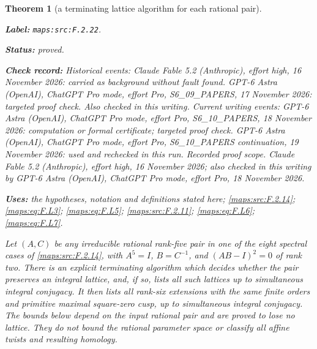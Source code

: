 \documentclass[11pt,a4paper]{article}
\newtheorem{theorem}{Theorem}[section]
\theoremstyle{definition}
\newcommand{\StatementRecord}[4]{\par\smallskip\begingroup\upshape\raggedright\noindent\textbf{Label:} \nolinkurl{#1}.\par\noindent\textbf{Status:} #2.\par\noindent\textbf{Check record:} #3.\par\noindent\textbf{Uses:} #4.\par\endgroup\smallskip}
\begin{document}
\begin{theorem}[a terminating lattice algorithm for each rational pair]\label{maps:src:F.2.22}
\StatementRecord{maps:src:F.2.22}{proved}{Historical events: Claude Fable 5.2 (Anthropic), effort high, 16 November 2026: carried as background without fault found. GPT-6 Astra (OpenAI), ChatGPT Pro mode, effort Pro, S6\_09\_PAPERS, 17 November 2026: targeted proof check. Also checked in this writing. Current writing events: GPT-6 Astra (OpenAI), ChatGPT Pro mode, effort Pro, S6\_10\_PAPERS, 18 November 2026: computation or formal certificate; targeted proof check. GPT-6 Astra (OpenAI), ChatGPT Pro mode, effort Pro, S6\_10\_PAPERS continuation, 19 November 2026: used and rechecked in this run. \emph{Recorded proof scope.} Claude Fable 5.2 (Anthropic), effort high, 16 November 2026; also checked in this writing by GPT-6 Astra (OpenAI), ChatGPT Pro mode, effort Pro, 18 November 2026}{the hypotheses, notation and definitions stated here; \cref{maps:src:F.2.14}; \cref{maps:eq:F.L3}; \cref{maps:eq:F.L5}; \cref{maps:src:F.2.11}; \cref{maps:eq:F.L6}; \cref{maps:eq:F.L7}}


Let $(A,C)$ be any irreducible rational rank-five pair in
one of the eight spectral cases of \ref{maps:src:F.2.14}, with
$A^5=I$, $B=C^{-1}$, and $(AB-I)^2=0$ of rank two.
There is an explicit terminating algorithm which decides
whether the pair preserves an integral lattice, and, if so,
lists all such lattices up to simultaneous integral conjugacy.
It then lists all rank-six extensions with the same finite
orders and primitive maximal square-zero cusp, up to
simultaneous integral conjugacy.  The bounds below depend
on the input rational pair and are proved to lose no lattice.
They do not bound the rational parameter space or classify
all affine twists and resulting homology.

\end{theorem}
\end{document}
